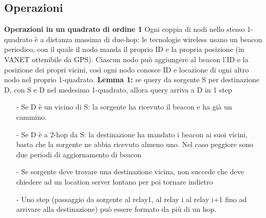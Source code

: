 \documentclass[12pt,italian]{report}
\begin{document}
\subsection{Operazioni}
\noindent \textbf{Operazioni in un quadrato di ordine 1} 
\bigbreak
Ogni coppia di nodi nello stesso 1-quadrato è a distanza massima di due-hop: le tecnologie wireless usano un beacon periodico, con il quale il nodo manda il proprio ID e la propria posizione (in VANET ottenibile da GPS). Ciascun nodo può aggiungere al beacon l'ID e la posizione dei propri vicini, così ogni nodo conosce ID e locazione di ogni altro nodo nel proprio 1-quadrato. 
\bigbreak
\noindent \textbf{Lemma 1:} se query da sorgente S per destinazione D, con S e D nel medesimo 1-quadrato, allora query arriva a D in 1 step
\begin{itemize}
    \item [-] Se D è un vicino di S: la sorgente ha ricevuto il beacon e ha già un cammino. 
    \item [-] Se D è a 2-hop da S: la destinazione ha mandato i beacon ai suoi vicini, basta che la sorgente ne abbia ricevuto almeno uno. Nel caso peggiore sono due periodi di aggiornamento di beacon
    \item[-] Se sorgente deve trovare una destinazione vicina, non succede che deve chiedere ad un location server lontano per poi tornare indietro
    \item[-] Uno step (passaggio da sorgente al relay1, al relay i al relay i+1 fino ad arrivare alla destinazione) può essere formato da più di un hop.
\end{itemize}
\end{document}

